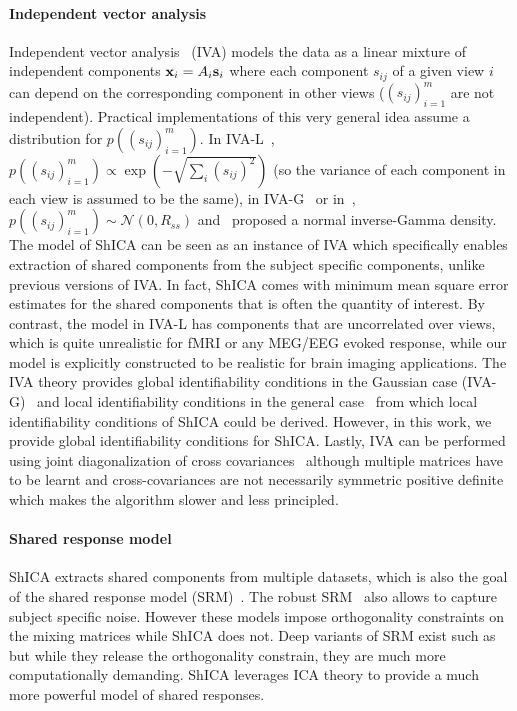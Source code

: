 \documentclass[12pt]{report}
\begin{document}
\paragraph{Independent vector analysis}
Independent vector analysis~\cite{lee2008independent} (IVA) models the data as a linear mixture of independent components $\mathbf{x}_i = A_i \mathbf{s}_i$ where each component $s_{ij}$ of a given view $i$ can depend on the corresponding component in other views ($(s_{ij})_{i=1}^m$ are not independent).
Practical implementations of this very general idea assume a distribution for $p((s_{ij})_{i=1}^m)$. In IVA-L~\cite{lee2008independent}, $p((s_{ij})_{i=1}^m) \propto \exp(-\sqrt{\sum_i (s_{ij})^2})$ (so the variance of each component in each view is assumed to be the same), in IVA-G~\cite{anderson2011joint} or in~\cite{via2011maximum}, $p((s_{ij})_{i=1}^m) \sim \mathcal{N}(0, R_{ss})$ and~\cite{engberg2016independent} proposed a normal inverse-Gamma density. The model of ShICA can be seen as an instance of IVA %
which specifically enables extraction of shared components from the subject specific components, unlike previous versions of IVA. In fact, ShICA comes with minimum mean square error estimates for the shared components
that is often the quantity of interest. By contrast, the model in IVA-L has components that are uncorrelated over views, which is quite unrealistic for fMRI or any MEG/EEG evoked response, while our model is explicitly constructed to be realistic for brain imaging applications.
The IVA theory provides global identifiability conditions in the Gaussian case (IVA-G)~\cite{via2011joint} and local identifiability conditions in the general case~\cite{anderson2014independent} from which local identifiability conditions of ShICA could be derived. However, in this work, we provide global identifiability conditions for ShICA.
Lastly, IVA can be performed using joint diagonalization of cross covariances~\cite{li2011joint, congedo2012orthogonal} although multiple matrices have to be learnt and cross-covariances are not necessarily symmetric positive definite which makes the algorithm slower and less principled.

\paragraph{Shared response model}
ShICA extracts shared components from multiple datasets, which is also the goal of the shared response model (SRM)~\cite{chen2015reduced}. The robust SRM~\cite{turek2018capturing} also allows to capture subject specific noise. However these models impose orthogonality constraints on the mixing matrices while ShICA does not. Deep variants of SRM exist such as~\cite{chen2016convolutional} but while they release the orthogonality constrain, they are much more computationally demanding. ShICA leverages ICA theory to provide a much more powerful model of shared responses.
\end{document}

